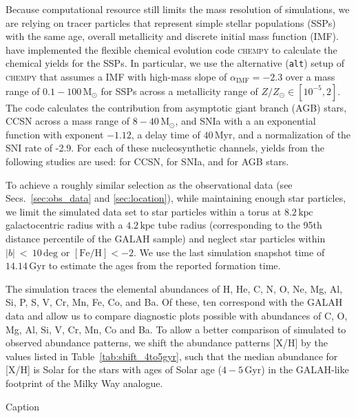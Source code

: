 \documentclass[fleqn,usenatbib]{mnras}
\begin{document}
Because computational resource still limits the mass resolution of simulations, we are relying on tracer particles that represent simple stellar populations (SSPs) with the same age, overall metallicity and discrete initial mass function (IMF). \citet{Buck2021} have implemented the flexible chemical evolution code \textsc{chempy} \citep{Rybizki2017} to calculate the chemical yields for the SSPs. In particular, we use the alternative (\texttt{alt}) setup of \textsc{chempy} that assumes a \citet{Chabrier2003} IMF with high-mass slope of $\alpha_\text{IMF} = -2.3$ over a mass range of $0.1-100\,\mathrm{M_\odot}$ for SSPs across a metallicity range of $Z/Z_\odot \in [10^{-5},2]$. The code calculates the contribution from asymptotic giant branch (AGB) stars, CCSN across a mass range of $8-40\,\mathrm{M_\odot}$, and SNIa with a an exponential function with exponent $-1.12$, a delay time of $40\,\mathrm{Myr}$, and a normalization of the SNI rate of -2.9. For each of these nucleosynthetic channels, yields from the following studies are used: \citet{Limongi2018} for CCSN, \citet{Seitenzahl2013} for SNIa, and \citet{Karakas2016} for AGB stars.

To achieve a roughly similar selection as the observational data (see Secs.~\ref{sec:obs_data} and \ref{sec:location}), while maintaining enough star particles, we limit the simulated data set to star particles within a torus at $8.2\,\mathrm{kpc}$ galactocentric radius with a $4.2\,\mathrm{kpc}$ tube radius (corresponding to the 95th distance percentile of the GALAH sample) and neglect star particles within $\vert b \vert~<~10\,\mathrm{deg}$ or $\mathrm{[Fe/H]} < -2$. We 
use the last simulation snapshot time of $14.14\,\mathrm{Gyr}$ to estimate the ages from the reported formation time.

The simulation traces the elemental abundances of H, He, C, N, O, Ne, Mg, Al, Si, P, S, V, Cr, Mn, Fe, Co, and Ba. Of these, ten correspond with the GALAH data and allow us to compare diagnostic plots possible with abundances of C, O, Mg, Al, Si, V, Cr, Mn, Co and Ba. To allow a better comparison of simulated to observed abundance patterns, we shift the abundance patterns [X/H] by the values listed in Table~\ref{tab:shift_4to5gyr}, such that the median abundance for [X/H] is Solar for the stars with ages of Solar age ($4-5\,\mathrm{Gyr}$) in the GALAH-like footprint of the Milky Way analogue.

\begin{table}
    \centering
    \caption{Caption}
    
    \label{tab:shift_4to5gyr}
\end{table}
\end{document}
